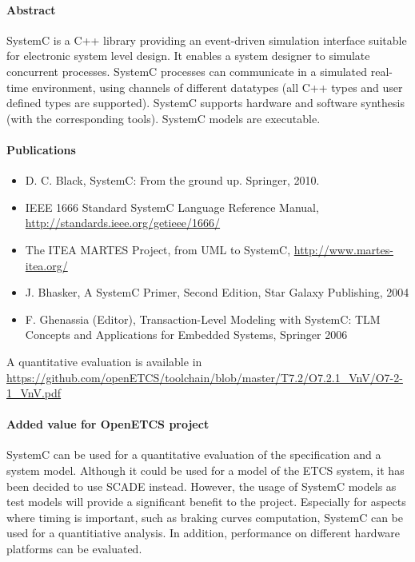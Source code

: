 \paragraph{Abstract} SystemC is a C++ library providing an event-driven simulation interface suitable for electronic system level design. It enables a system designer to simulate concurrent processes. SystemC processes can communicate in a simulated real-time environment, using channels of different datatypes (all C++ types and user defined types are supported). SystemC supports hardware and software synthesis (with the corresponding tools). SystemC models are executable.

\paragraph{Publications} 

\begin{itemize}
\item D. C. Black, SystemC: From the ground up. Springer, 2010.
\item IEEE 1666 Standard SystemC Language Reference Manual, \url{http://standards.ieee.org/getieee/1666/}
\item The ITEA MARTES Project, from UML to SystemC, \url{http://www.martes-itea.org/}
\item J. Bhasker, A SystemC Primer, Second Edition, Star Galaxy Publishing, 2004
\item F. Ghenassia (Editor), Transaction-Level Modeling with SystemC: TLM Concepts and
Applications for Embedded Systems, Springer 2006
\end{itemize}


A quantitative evaluation is available in \url{https://github.com/openETCS/toolchain/blob/master/T7.2/O7.2.1_VnV/O7-2-1_VnV.pdf}

\paragraph{Added value for OpenETCS project}

SystemC can be used for a quantitative evaluation of the specification and a system model. Although it could be used for a model of the ETCS system, it has been decided to use SCADE instead. However, the usage of SystemC models as test models will provide a significant benefit to the project. Especially for aspects where timing is important, such as braking curves computation, SystemC can be used for a quantitiative analysis. In addition, performance on different hardware platforms can be evaluated.

